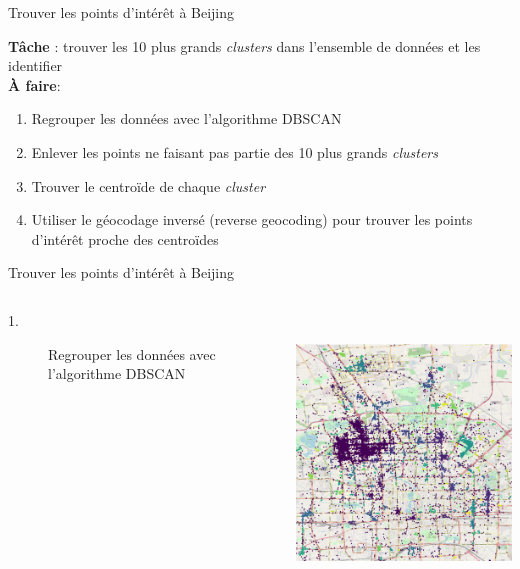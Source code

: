 \documentclass[aspectratio=169]{beamer}
\begin{document}
\begin{frame}{Trouver les points d'intérêt à Beijing}

{\Large \textbf{Tâche} : trouver les 10 plus grands \textit{clusters} dans l'ensemble de données et les identifier}
\vspace{.5cm}
\\
{\Large \textbf{À faire}}:
\begin{enumerate}
	\item Regrouper les données avec l'algorithme DBSCAN
	\item Enlever les points ne faisant pas partie des 10 plus grands \textit{clusters}
	\item Trouver le centroïde de chaque \textit{cluster}
	\item Utiliser le géocodage inversé (reverse geocoding) pour trouver les points d'intérêt proche des centroïdes
\end{enumerate}
\end{frame}

\begin{frame}{Trouver les points d'intérêt à Beijing}
\begin{columns}
\begin{column}{0.5\textwidth}
\begin{description}
	\item [1.] Regrouper les données avec l'algorithme DBSCAN
\end{description}
\end{column}
\begin{column}{0.5\textwidth}  %
     \centering
	\includegraphics[height=7.5cm]{figures/cluttered_map}
\end{column}
\end{columns}
\end{frame}
\end{document}
